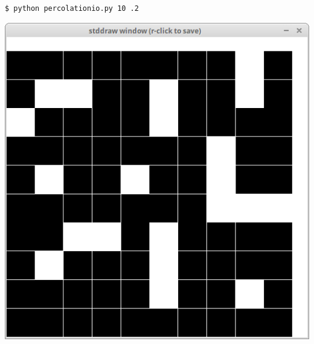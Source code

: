\documentclass[8pt,a4paper,compress,handout]{beamer}
\begin{document}
\begin{frame}[fragile]
\begin{minipage}{160pt}
\begin{lstlisting}[language={}]
$ python percolationio.py 10 .2
\end{lstlisting}
\end{minipage}%
\begin{minipage}{140pt}
\hfill \includegraphics[scale=0.15]{figures/percolation2.png}
\end{minipage}

\smallskip


\end{frame}
\end{document}
